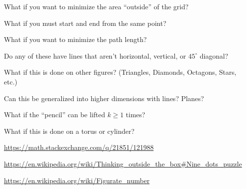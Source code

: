 \documentclass{article}
\begin{document}
\begin{related}
  \item What if you want to minimize the area ``outside'' of the grid?
  \item What if you must start and end from the same point?
  \item What if you want to minimize the path length?
  \item Do any of these have lines that aren't horizontal, vertical, or $45^\circ$ diagonal?
  \item What if this is done on other figures? (Triangles, Diamonds, Octagons, Stars, etc.)
  \item Can this be generalized into higher dimensions with lines? Planes?
  \item What if the ``pencil'' can be lifted $k \geq 1$ times?
  \item What if this is done on a torus or cylinder?
\end{related}
\begin{references}
  \item \url{https://math.stackexchange.com/q/21851/121988}
  \item \url{https://en.wikipedia.org/wiki/Thinking_outside_the_box#Nine_dots_puzzle}
  \item \url{https://en.wikipedia.org/wiki/Figurate_number}
\end{references}
\end{document}
